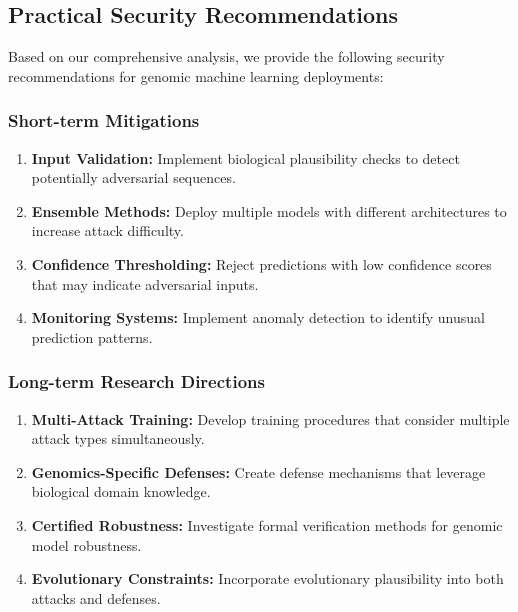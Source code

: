 \documentclass{article} %
\begin{document}
\subsection{Practical Security Recommendations}

Based on our comprehensive analysis, we provide the following security recommendations for genomic machine learning deployments:

\subsubsection{Short-term Mitigations}

\begin{enumerate}
    \item \textbf{Input Validation:} Implement biological plausibility checks to detect potentially adversarial sequences.
    
    \item \textbf{Ensemble Methods:} Deploy multiple models with different architectures to increase attack difficulty.
    
    \item \textbf{Confidence Thresholding:} Reject predictions with low confidence scores that may indicate adversarial inputs.
    
    \item \textbf{Monitoring Systems:} Implement anomaly detection to identify unusual prediction patterns.
\end{enumerate}

\subsubsection{Long-term Research Directions}

\begin{enumerate}
    \item \textbf{Multi-Attack Training:} Develop training procedures that consider multiple attack types simultaneously.
    
    \item \textbf{Genomics-Specific Defenses:} Create defense mechanisms that leverage biological domain knowledge.
    
    \item \textbf{Certified Robustness:} Investigate formal verification methods for genomic model robustness.
    
    \item \textbf{Evolutionary Constraints:} Incorporate evolutionary plausibility into both attacks and defenses.
\end{enumerate}
\end{document}

